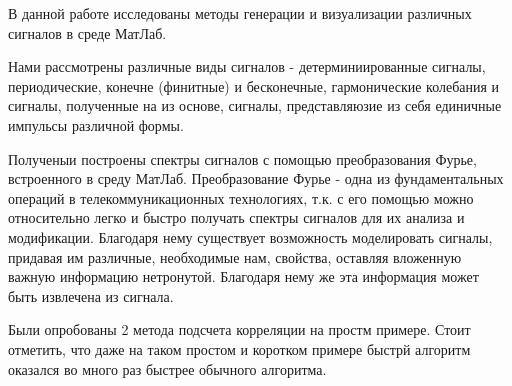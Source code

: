 В данной работе исследованы методы генерации и визуализации различных сигналов в среде МатЛаб. 

Нами рассмотрены различные виды сигналов - детерминиированные сигналы, периодические, конечне (финитные) и бесконечные, гармонические колебания и сигналы, полученные на из основе, сигналы, представляюзие из себя единичные импульсы различной формы.

Полученыи построены спектры сигналов с помощью преобразования Фурье, встроенного в среду МатЛаб. Преобразование Фурье - одна из фундаментальных операций в телекоммуникационных технологиях, т.к. с его помощью можно относительно легко и быстро получать спектры сигналов для их анализа и модификации. Благодаря нему существует возможность моделировать сигналы, придавая им различные, необходимые нам, свойства, оставляя вложенную важную информацию нетронутой. Благодаря нему же эта информация может быть извлечена из сигнала.

Были опробованы 2 метода подсчета корреляции на простм примере. Стоит отметить, что даже на таком простом и коротком примере быстрй алгоритм оказался во много раз быстрее обычного алгоритма.



